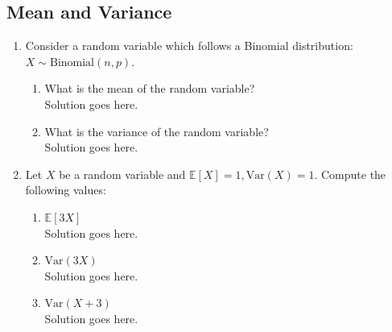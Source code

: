 \documentclass[a4paper]{article}
\theoremstyle{definition}
\newcommand{\Var}{\mathrm{Var}}
\newenvironment{soln}{
    \leavevmode\color{blue}\ignorespaces
}{}
\begin{document}
\subsection{Mean and Variance}
\begin{enumerate}
\item Consider a random variable which follows a Binomial
  distribution: $X \sim \text{Binomial}(n, p)$.
  \begin{enumerate}
  \item What is the mean of the random variable?\\
    \begin{soln}  Solution goes here. \end{soln}
  \item What is the variance of the random variable?\\
    \begin{soln}  Solution goes here. \end{soln}
  \end{enumerate}

\item Let $X$ be a random variable and
  $\mathbb{E}[X] = 1, \Var(X) = 1$. Compute the following values:
  \begin{enumerate}
  \item $\mathbb{E}[3X]$\\
    \begin{soln}  Solution goes here. \end{soln}
  \item $\Var(3X)$\\
    \begin{soln}  Solution goes here. \end{soln}
  \item $\Var(X+3)$\\
    \begin{soln}  Solution goes here. \end{soln}
  \end{enumerate}
\end{enumerate}

\end{document}
